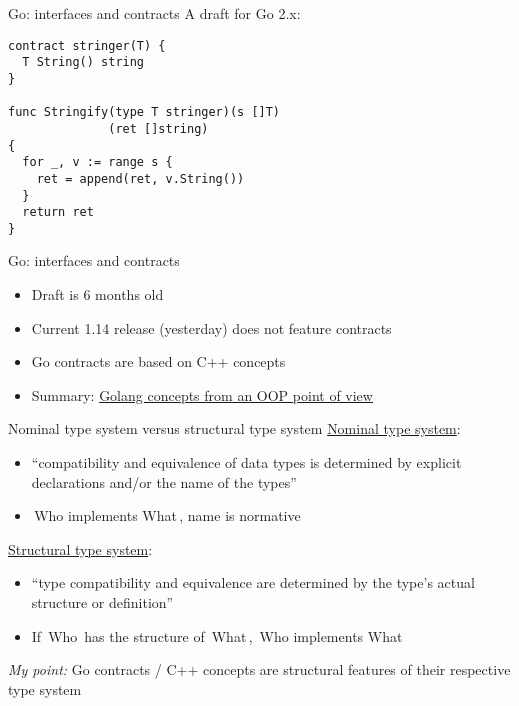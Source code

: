 \documentclass{beamer}
\newcommand\code[1]{\,{\color[HTML]{884400}#1}\,}
\begin{document}
\begin{frame}[fragile]{Go: interfaces and contracts}
  A draft for Go 2.x:

  \begin{verbatim}
contract stringer(T) {
  T String() string
}

func Stringify(type T stringer)(s []T)
              (ret []string)
{
  for _, v := range s {
    ret = append(ret, v.String())
  }
  return ret
}
  \end{verbatim}
\end{frame}

\begin{frame}[fragile]{Go: interfaces and contracts}
  \begin{itemize}
    \item Draft is 6 months old
    \item Current 1.14 release (yesterday) does not feature contracts
    \item Go contracts are based on C++ concepts
    \item Summary: \href{https://github.com/luciotato/golang-notes/blob/master/OOP.md}{Golang concepts from an OOP point of view}
  \end{itemize}
\end{frame}

\begin{frame}[fragile]{Nominal type system versus structural type system}
  \href{https://en.wikipedia.org/wiki/Nominal_type_system}{Nominal type system}:
  \begin{itemize}
    \item \enquote{compatibility and equivalence of data types is determined by explicit declarations and/or the name of the types}
    \item \code{Who implements What}, name is normative
  \end{itemize}

  \href{https://en.wikipedia.org/wiki/Structural_type_system}{Structural type system}:
  \begin{itemize}
    \item \enquote{type compatibility and equivalence are determined by the type's actual structure or definition}
    \item If \code{Who} has the structure of \code{What}, \code{Who implements What}
  \end{itemize}

  \emph{My point:} Go contracts / C++ concepts are structural features of their respective type system
\end{frame}
\end{document}

